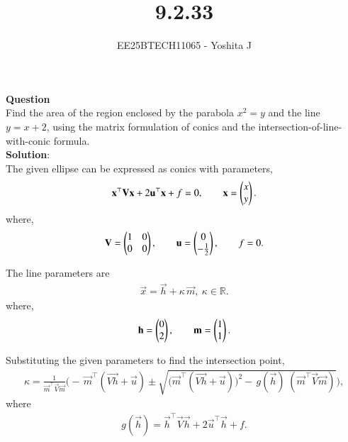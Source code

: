\documentclass[journal]{IEEEtran}
\begin{document}

\vspace{3cm}

\title{9.2.33}
\author{EE25BTECH11065 - Yoshita J}
{\let\newpage\relax\maketitle}

\renewcommand{\thefigure}{\theenumi}
\renewcommand{\thetable}{\theenumi}
\setlength{\intextsep}{10pt}

\textbf{Question}\\
Find the area of the region enclosed by the parabola \(x^{2}=y\) and the line \(y=x+2\), using the matrix formulation of conics and the intersection-of-line-with-conic formula.\\

\textbf{Solution}:\\

The given ellipse can be expressed as conics with parameters,
\begin{align*}
\mathbf{x}^{\top}\mathbf{V}\mathbf{x}+2\mathbf{u}^{\top}\mathbf{x}+f=0,\qquad 
\mathbf{x}=\begin{pmatrix}x\\y\end{pmatrix}.
\end{align*}
where,
\begin{align}
\mathbf{V}=\begin{pmatrix}1 & 0\\0 & 0\end{pmatrix},\qquad
\mathbf{u}=\begin{pmatrix}0\\-\tfrac{1}{2}\end{pmatrix},\qquad
f=0.
\end{align}

The line parameters are 
\begin{align*}
\vec{x}=\vec{h}+\kappa\,\vec{m},\ \kappa\in\mathbb R.
\end{align*}
where,
\begin{align}
\mathbf{h}=\begin{pmatrix}0\\2\end{pmatrix},\qquad \mathbf{m}=\begin{pmatrix}1\\1\end{pmatrix}.
\end{align}

Substituting the given parameters to find the intersection point,
\begin{align}
\kappa=\frac{1}{\vec{m}^{\top}\vec{V}\vec{m}}\Big(
-\,\vec{m}^{\top}(\vec{Vh}+\vec{u})
\pm
\sqrt{\big(\vec{m}^{\top}(\vec{Vh}+\vec{u})\big)^{2}
-\,g(\vec{h})\;(\vec{m}^{\top}\vec{V}\vec{m})}
\Big),
\end{align}
where 
\begin{align}
g(\vec{h})=\vec{h}^{\top}\vec{V}\vec{h}+2\vec{u}^{\top}\vec{h}+f.
\end{align}
\end{document}
